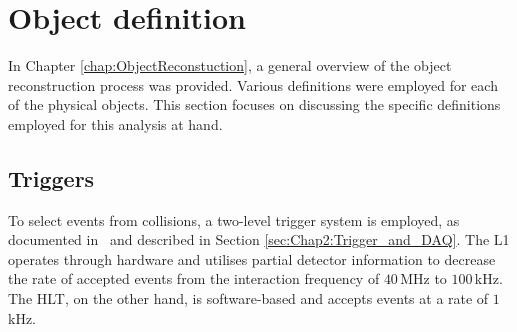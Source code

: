 



\section{Object definition}
\label{sec:ChaptH:ObjectDefReco}
In Chapter \ref{chap:ObjectReconstuction}, a general overview of the object 
reconstruction process was provided. Various definitions were employed for 
each of the physical objects. This section focuses on discussing the specific 
definitions employed for this analysis at hand.





%
%
\subsection{Triggers}
\label{sec:ChaptH:ObjectDefReco:trigger}
To select events from collisions, a two-level trigger system is employed, as documented in~\cite{TRIG-2016-01} and 
described in Section \ref{sec:Chap2:Trigger_and_DAQ}. 
The L1 operates through hardware and utilises partial detector information to decrease the rate of accepted events from 
the interaction frequency of $40\,$MHz to $100\,$kHz. The HLT, on the other hand, is software-based and accepts 
events at a rate of $1\,$kHz.

